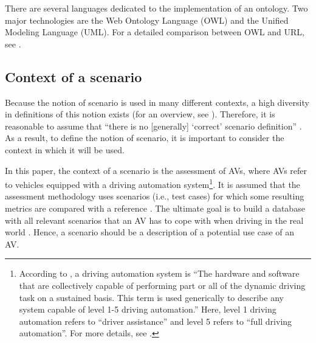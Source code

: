 There are several languages dedicated to the implementation of an ontology. Two major technologies are the Web Ontology Language (OWL) and the Unified Modeling Language (UML). 
For a detailed comparison between OWL and URL, see \cite{kiko2005detailed}.



\subsection{Context of a scenario}
\label{sec:context}

Because the notion of scenario is used in many different contexts, a high diversity in definitions of this notion exists (for an overview, see \cite{vannotten2003updated, bishop2007scentechniques}). Therefore, it is reasonable to assume that ``there is no [generally] `correct' scenario definition'' \cite{vannotten2003updated}. As a result, to define the notion of scenario, it is important to consider the context in which it will be used. 

In this paper, the context of a scenario is the assessment of AVs, where AVs refer to vehicles equipped with a driving automation system\footnote{According to \cite{sae2018j3016}, a driving automation system is ``The hardware and software that are collectively capable of performing part or all of the dynamic driving task on a sustained basis. This term is used generically to describe any system capable of level 1-5 driving automation.'' Here, level 1 driving automation refers to ``driver assistance'' and level 5 refers to ``full driving automation''. For more details, see \cite{sae2018j3016}.}. 
It is assumed that the assessment methodology uses scenarios (i.e., test cases) for which some resulting metrics are compared with a reference \cite{stellet2015taxonomy}. 
The ultimate goal is to build a database with all relevant scenarios that an AV has to cope with when driving in the real world \cite{putz2017pegasus}. Hence, a scenario should be a description of a potential use case of an AV. 

